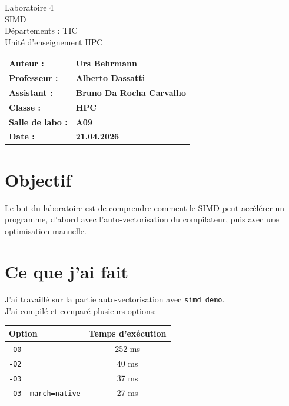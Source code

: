 \documentclass[a4paper,12pt]{article}
\begin{document}
\thispagestyle{firstpage}

\vspace*{2cm}
\begin{center}
    \Huge Laboratoire 4 \\
    \vspace{0.2cm}
    \Large SIMD \\
    \vspace{1cm}
    \small Départements : TIC\\
    Unité d'enseignement HPC\\
\end{center}

\vspace{9cm}
\renewcommand{\arraystretch}{1.5}
\begin{flushleft}
    \begin{tabular}{@{}l l@{}}
        \textbf{Auteur :}       & \textbf{Urs Behrmann} \\
        \textbf{Professeur :}   & \textbf{Alberto Dassatti} \\
        \textbf{Assistant :}    & \textbf{Bruno Da Rocha Carvalho} \\
        \textbf{Classe :}       & \textbf{HPC} \\
        \textbf{Salle de labo :}& \textbf{A09} \\
        \textbf{Date :}         & \textbf{21.04.2026} \\
    \end{tabular}
\end{flushleft}

\newpage
\pagestyle{otherpages}
\tableofcontents
\newpage

\section{Objectif}
Le but du laboratoire est de comprendre comment le SIMD peut accélérer un programme, d'abord avec l'auto-vectorisation du compilateur, puis avec une optimisation manuelle.

\section{Ce que j'ai fait}
J'ai travaillé sur la partie auto-vectorisation avec \texttt{simd\_demo}.\\
J'ai compilé et comparé plusieurs options:
\begin{center}
\begin{tabular}{|l|c|}
\hline
Option & Temps d'exécution \\
\hline
\texttt{-O0} & 252 ms \\
\texttt{-O2} & 40 ms \\
\texttt{-O3} & 37 ms \\
\texttt{-O3 -march=native} & 27 ms \\
\hline
\end{tabular}
\end{center}
\end{document}

